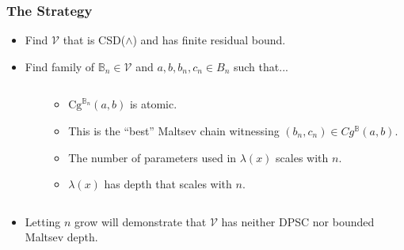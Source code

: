 \documentclass[compress,handout]{beamer}
\newcommand{\V}{\mathcal{V}}
\theoremstyle{plain} \newtheorem{thm}{Theorem}
\theoremstyle{definition} \newtheorem{defn}[thm]{Definition}
\theoremstyle{remark} \newtheorem*{rk}{Remark}
\theoremstyle{plain} \newtheorem*{question}{Question}
\newcommand{\m}[1]{\mathbb{#1}}   %
\newcommand{\Cg}{\text{Cg}}
\begin{document}
\begin{frame} \frametitle{The Strategy}
\begin{itemize} \setlength{\itemsep}{4ex}
  \item Find $\V$ that is CSD($\wedge$) and has finite residual bound.

  \pause \item Find family of $\m{B}_n\in \V$ and $a,b,b_n,c_n\in B_n$ such
  that...
  \begin{columns} \begin{column}{0.4\textwidth}
      \centering
    \end{column} \begin{column}{0.6\textwidth}
      \begin{itemize}
        \item $\Cg^{\m{B}_n}(a,b)$ is atomic.

        \pause \item This is the ``best'' Maltsev chain witnessing
        $(b_n,c_n)\in Cg^{\m{B}}(a,b)$.

        \pause \item The number of parameters used in $\lambda(x)$ scales
        with $n$.

        \pause \item $\lambda(x)$ has depth that scales with $n$.
      \end{itemize}
    \end{column} \end{columns}

  \pause \item Letting $n$ grow will demonstrate that $\V$ has neither DPSC
  nor bounded Maltsev depth.
\end{itemize}
\end{frame}
\end{document}
